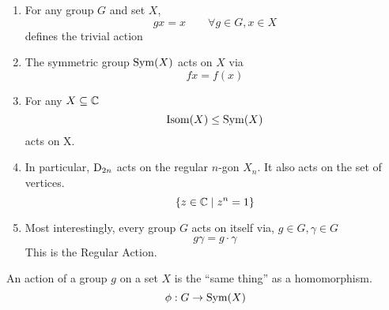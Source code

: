 \documentclass{article}
\begin{document}
\begin{eg}\leavevmode
    \begin{enumerate}
        \item For any group $G$ and set $X$,
        \[
            gx = x \qquad \forall g \in G, x \in X
        \]
        defines the trivial action

        \item The symmetric group $\operatorname{Sym}(X)$ acts on $X$ via
        \[
            fx = f(x)  
        \]

        \item For any $X \subseteq \mathbb{C}$
        \[
            \operatorname{Isom}(X) \leq \operatorname{Sym}(X)   
        \]
        acts on X.

        \item In particular, $\mathrm{D}_{2n}$ acts on the regular $n$-gon $X_n$. It also acts on the set of vertices.
        \[
            \{z \in \mathbb{C} \mid z^n = 1\}    
        \]

        \item Most interestingly, every group $G$ acts on itself via, $g \in G, \gamma \in G$
        \[
            g\gamma = g \cdot \gamma  
        \]
        This is the Regular Action.
    \end{enumerate}
\end{eg}

\begin{thm}
    An action of a group $g$ on a set $X$ is the ``same thing'' as a homomorphism.
    \[
        \phi: G \rightarrow \operatorname{Sym}(X)
    \]
\end{thm}
\end{document}
